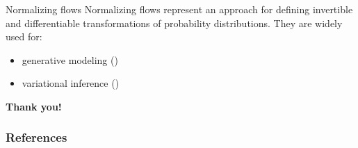     \begin{frame}{Normalizing flows}
        Normalizing flows represent an approach for defining invertible and differentiable transformations of probability distributions.
        They are widely used for:
        \begin{itemize}
            \item generative modeling (\cite[\textbf{GLOW}, \textbf{Real NVP}]{kingma_glow_2018, dinh_density_2017})
            \item variational inference (\cite{rezende_variational_2016, berg_sylvester_2019})
        \end{itemize}
    \end{frame}


    \begin{frame}
        \centering
        \textbf{\huge{Thank you!}}
    \end{frame}


    \begin{frame}[allowframebreaks]
        \frametitle{References}
        \renewcommand*{\bibfont}{\tiny}
        \printbibliography
    \end{frame}



